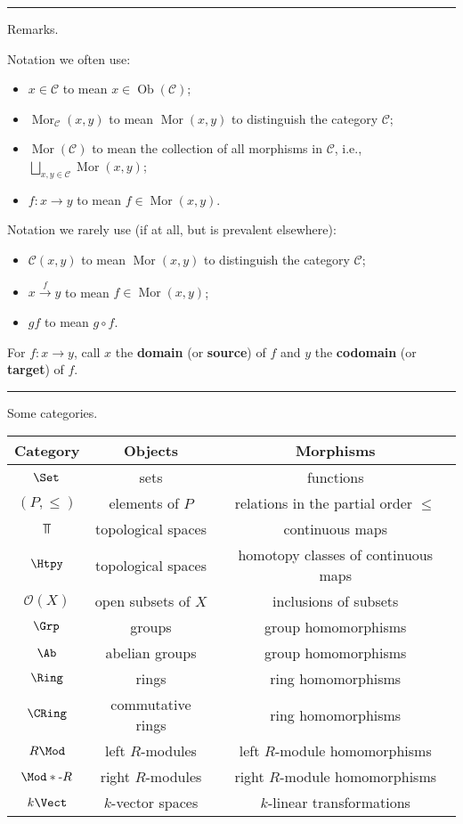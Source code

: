 \documentclass[12pt]{article}
\newcommand{\keyword}[1]{\textbf{#1}}
\newcommand{\sepline}{\rule{\textwidth}{0.4pt}}
\theoremstyle{definition}
\newcommand{\CC}{\mathcal{C}}
\newcommand{\OO}{\mathcal{O}}
\newcommand{\<}{\left\langle}
\renewcommand{\>}{\right\rangle}
\DeclareMathOperator{\Ob}{Ob}
\DeclareMathOperator{\Mor}{Mor}
\renewcommand{\_}[1]{{_{#1}}}
\begin{document}
\sepline

Remarks.

Notation we often use:
\begin{itemize}
    \item $x \in \CC$ to mean $x \in \Ob(\CC)$;
    \item $\Mor_\CC(x, y)$ to mean $\Mor(x, y)$ to distinguish the category $\CC$;
    \item $\Mor(\CC)$ to mean the collection of all morphisms in $\CC$, i.e., $\bigsqcup_{x, y \in \CC} \Mor(x, y)$;
    \item $f : x \to y$ to mean $f \in \Mor(x, y)$.
\end{itemize}

Notation we rarely use (if at all, but is prevalent elsewhere):
\begin{itemize}
    \item $\CC(x, y)$ to mean $\Mor(x, y)$ to distinguish the category $\CC$;
    \item  $x \xrightarrow{f} y$ to mean $f \in \Mor(x, y)$;
    \item $gf$ to mean $g \circ f$.
\end{itemize}

For $f : x \to y$, call $x$ the \keyword{domain} (or \keyword{source}) of $f$ and $y$ the \keyword{codomain} (or \keyword{target}) of $f$.


\sepline

Some categories.
\begin{center}
    \begin{tabular}{c|c|c}
        Category & Objects & Morphisms \\
        \hline
        $\Set$ & sets & functions \\
        $(P, \leq)$ & elements of $P$ & relations in the partial order $\leq$ \\
        $\Top$ & topological spaces & continuous maps \\
        $\Htpy$ & topological spaces & homotopy classes of continuous maps \\
        $\OO(X)$ & open subsets of $X$ & inclusions of subsets \\
        $\Grp$ & groups & group homomorphisms \\
        $\Ab$ & abelian groups & group homomorphisms \\
        $\Ring$ & rings & ring homomorphisms \\
        $\CRing$ & commutative rings & ring homomorphisms \\
        $R\Mod$ & left $R$-modules & left $R$-module homomorphisms \\
        $\Mod*\text{-}R$ & right $R$-modules & right $R$-module homomorphisms \\
        $k\Vect$ & $k$-vector spaces & $k$-linear transformations
    \end{tabular}
\end{center}
\end{document}
